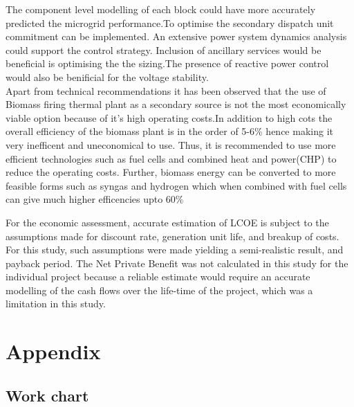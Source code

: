 \noindent The component level modelling of each block could have more accurately predicted the microgrid performance.To optimise the secondary dispatch unit commitment can be implemented. An extensive power system dynamics analysis could support the control strategy. Inclusion of ancillary services would be beneficial is optimising the the sizing.The presence of reactive power control would also be benificial for the voltage stability. \\
Apart from technical recommendations it has been observed that the use of Biomass firing thermal plant as a secondary source is not the most economically viable option because of it's high operating costs.In addition to high cots the overall efficiency of the biomass plant is in the order of 5-6\% hence making it very inefficent and uneconomical to use. Thus, it is recommended to use more efficient technologies such as fuel cells and combined heat and power(CHP) to reduce the operating costs. Further, biomass energy can be converted to more feasible forms such as syngas and hydrogen which when combined with fuel cells can give much higher efficencies upto 60$\%$

\noindent For the economic assessment, accurate estimation of LCOE is subject to the assumptions made for discount rate, generation unit life, and breakup of costs. For this study, such assumptions were made yielding a semi-realistic result, and payback period. The Net Private Benefit was not calculated in this study for the individual project because a reliable estimate would require an accurate modelling of the cash flows over the life-time of the project, which was a limitation in this study. 


\newpage

\section*{Appendix}

\subsection*{Work chart}

